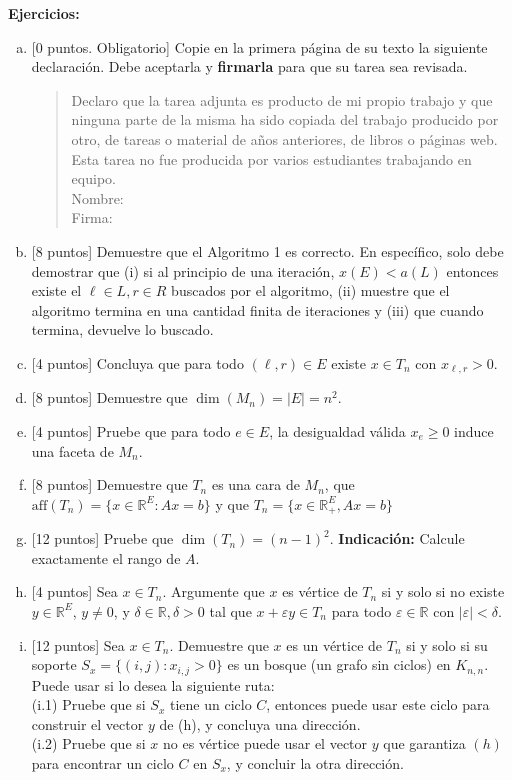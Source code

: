 \documentclass{article}
\newcommand{\RR}{\mathbb R}
\theoremstyle{plain}
\theoremstyle{definition}
\theoremstyle{Azul}
\begin{document}
\noindent \textbf{Ejercicios:}
\begin{enumerate}[(a)]
\item {} [0 puntos. Obligatorio] Copie en la primera página de su texto la siguiente declaración. Debe aceptarla y \textbf{firmarla} para que su tarea sea revisada.

\begin{quote}
    Declaro que la tarea adjunta es producto de mi propio trabajo y que ninguna parte de la misma ha sido copiada del trabajo producido por otro, de tareas o material de años anteriores, de libros o páginas web.
    Esta tarea no fue producida por varios estudiantes trabajando en equipo.\\
    
    Nombre:\\
    Firma:
\end{quote}
\item {} [8 puntos] Demuestre que el Algoritmo 1 es correcto. En específico, solo debe demostrar que (i) si al principio de una iteración, $x(E)< a(L)$ entonces existe el $\ell \in L, r\in R$ buscados por el algoritmo, (ii) muestre que el algoritmo termina en una cantidad finita de iteraciones y (iii) que cuando termina, devuelve lo buscado.
\item {} [4 puntos] Concluya que para todo $(\ell,r)\in E$ existe $x\in T_n$ con $x_{\ell,r}>0$.
\item {} [8 puntos] Demuestre que $\dim(M_n)=|E|=n^2$.
\item {} [4 puntos] Pruebe que para todo $e\in E$, la desigualdad válida $x_e\geq 0$ induce una faceta de $M_n$.
\item {} [8 puntos] Demuestre que $T_n$ es una cara de $M_n$, que $\text{aff}(T_n)=\{x\in \RR^E\colon Ax=b\}$ y que $T_n=\{x\in \RR^E_+, Ax=b\}$
\item {} [12 puntos] Pruebe que $\dim(T_n)=(n-1)^2$. \textbf{Indicación:} Calcule exactamente el rango de $A$.
\item {} [4 puntos] Sea $x\in T_n$. Argumente que $x$ es vértice de $T_n$ si y solo si no existe $y\in \RR^E$, $y\neq 0$, y $\delta\in \RR, \delta>0$ tal que  $x+\varepsilon y\in T_n$ para todo $\varepsilon\in \RR$ con $|\varepsilon|<\delta$.
\item {} [12 puntos] Sea $x\in T_n$. Demuestre que $x$ es un vértice de $T_n$ si y solo si su soporte $S_x=\{(i,j)\colon x_{i,j}>0\}$ es un bosque (un grafo sin ciclos) en $K_{n,n}$. Puede usar si lo desea la siguiente ruta:\\
(i.1) Pruebe que si $S_x$ tiene un ciclo $C$, entonces puede usar este ciclo para construir el vector $y$ de (h), y concluya una dirección.\\
(i.2) Pruebe que si $x$ no es vértice puede usar el vector $y$ que garantiza $(h)$ para encontrar un ciclo $C$ en $S_x$, y concluir la otra dirección.
\end{enumerate}




	
\end{document}
